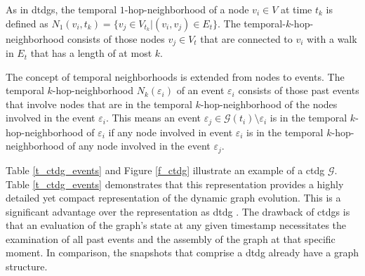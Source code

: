 
As in \glspl{dtdg}, the temporal $1$-hop-neighborhood of a node $v_i \in V$ at time $t_k$ is defined as $N_1(v_i, t_k) = \{v_j \in V_{t_k} | (v_i, v_j) \in E_t\}$. The temporal-$k$-hop-neighborhood consists of those nodes $v_j \in V_t$ that are connected to $v_i$ with a walk in $E_t$ that has a length of at most $k$.


The concept of temporal neighborhoods is extended from nodes to events. The temporal $k$-hop-neighborhood $N_k(\varepsilon_i)$ of an event $\varepsilon_{i}$ consists of those past events that involve nodes that are in the temporal $k$-hop-neighborhood of the nodes involved in the event $\varepsilon_{i}$. This means an event $\varepsilon_{j} \in \mathcal{G}(t_i) \setminus \varepsilon_{i}$ is in the temporal $k$-hop-neighborhood of $\varepsilon_{i}$ if any node involved in event $\varepsilon_{i}$ is in the temporal $k$-hop-neighborhood of any node involved in the event $\varepsilon_{j}$.

Table \ref{t_ctdg_events} and Figure \ref{f_ctdg} illustrate an example of a \gls{ctdg} $\mathcal{G}$. Table \ref{t_ctdg_events} demonstrates that this representation provides a highly detailed yet compact representation of the dynamic graph evolution. This is a significant advantage over the representation as \gls{dtdg} \cite{trivedi_dyrep_2019}. The drawback of \glspl{ctdg} is that an evaluation of the graph's state at any given timestamp necessitates the examination of all past events and the assembly of the graph at that specific moment. In comparison, the snapshots that comprise a \gls{dtdg} already have a graph structure.

